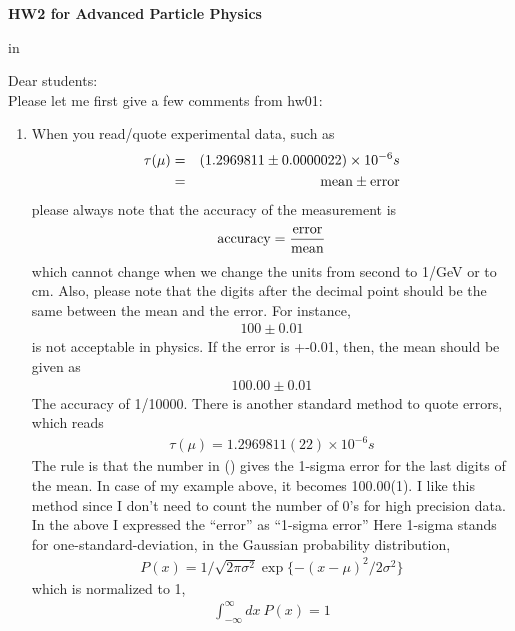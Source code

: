\documentclass[12pt]{article}
\begin{document}
\begin{center}
{\large\bf HW2 for Advanced Particle Physics} \\

\end{center}

 in

Dear students:\\

Please let me first give a few comments from hw01:\\

\begin{enumerate}
  \item When you read/quote experimental data, such as
\begin{eqnarray}
\tau(\mu)&=& (1.2969811\pm 0.0000022) \times 10^{-6} s\\
        &=& \rm mean \pm \rm error
\end{eqnarray}
please always note that the accuracy of the measurement is\\
\begin{eqnarray}                 
\rm accuracy = \frac{\rm error}{\rm mean}                 
\end{eqnarray}
which cannot change when we change the units from second
to 1/GeV or to cm.  Also, please note that the digits
after the decimal point should be the same between the
mean and the error.  For instance,\\
\begin{eqnarray} 
100 \pm 0.01
\end{eqnarray} 
is not acceptable in physics.  If the error is +-0.01,
then, the mean should be given as\\
\begin{eqnarray} 
100.00 \pm 0.01
\end{eqnarray} 
The accuracy of 1/10000.  There is another standard
method to quote errors, which reads\\
\begin{eqnarray} 
\tau(\mu) = 1.2969811(22) \times 10^{-6} s
\end{eqnarray} 
The rule is that the number in () gives the 1-sigma
error for the last digits of the mean.  In case of
my example above, it becomes 100.00(1).
I like this method since I don't need to count the
number of 0's for high precision data.\\

In the above I expressed the ``error'' as ``1-sigma error''
Here 1-sigma stands for one-standard-deviation, in
the Gaussian probability distribution,\\
\begin{eqnarray} 
P(x) = 1/\sqrt{2\pi\sigma^2} \exp\{-(x-\mu)^2/2\sigma^2\}
\end{eqnarray} 
which is normalized to 1,\\
\begin{eqnarray} 
\int_{-\infty}^{\infty} dx ~ P(x) = 1
\end{eqnarray} 


\end{enumerate}
\end{document}
